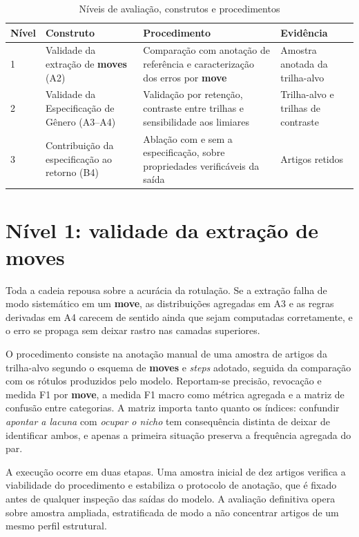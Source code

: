 \begin{table}[H]
\centering
\caption{Níveis de avaliação, construtos e procedimentos}
\label{tab:niveis-avaliacao}
\small
\begin{tabular}{|p{1.0cm}|p{3.3cm}|p{5.3cm}|p{3.7cm}|}
\hline
\textbf{Nível} & \textbf{Construto} & \textbf{Procedimento} & \textbf{Evidência} \\
\hline
1 & Validade da extração de \textbf{moves} (A2) & Comparação com anotação de referência e caracterização dos erros por \textbf{move} & Amostra anotada da trilha-alvo \\
\hline
2 & Validade da Especificação de Gênero (A3--A4) & Validação por retenção, contraste entre trilhas e sensibilidade aos limiares & Trilha-alvo e trilhas de contraste \\
\hline
3 & Contribuição da especificação ao retorno (B4) & Ablação com e sem a especificação, sobre propriedades verificáveis da saída & Artigos retidos \\
\hline
\end{tabular}
\end{table}


\section{Nível 1: validade da extração de \textbf{moves}}
\label{sec:nivel1}

Toda a cadeia repousa sobre a acurácia da rotulação. Se a extração falha de modo sistemático em um \textbf{move}, as distribuições agregadas em A3 e as regras derivadas em A4 carecem de sentido ainda que sejam computadas corretamente, e o erro se propaga sem deixar rastro nas camadas superiores.

O procedimento consiste na anotação manual de uma amostra de artigos da trilha-alvo segundo o esquema de \textbf{moves} e \textit{steps} adotado, seguida da comparação com os rótulos produzidos pelo modelo. Reportam-se precisão, revocação e medida F1 por \textbf{move}, a medida F1 macro como métrica agregada e a matriz de confusão entre categorias. A matriz importa tanto quanto os índices: confundir \textit{apontar a lacuna} com \textit{ocupar o nicho} tem consequência distinta de deixar de identificar ambos, e apenas a primeira situação preserva a frequência agregada do par.

A execução ocorre em duas etapas. Uma amostra inicial de dez artigos verifica a viabilidade do procedimento e estabiliza o protocolo de anotação, que é fixado antes de qualquer inspeção das saídas do modelo. A avaliação definitiva opera sobre amostra ampliada, estratificada de modo a não concentrar artigos de um mesmo perfil estrutural.

